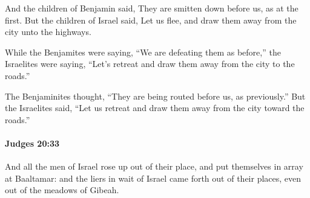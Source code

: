 			\begin{versebox}
					\item[BHS] 
					\item[ASV] And the children of Benjamin said, They are smitten down before us, as at the first. But the children of Israel said, Let us flee, and draw them away from the city unto the highways.
					\item[NIV] While the Benjamites were saying, “We are defeating them as before,” the Israelites were saying, “Let’s retreat and draw them away from the city to the roads.”
					\item[NRSV] The Benjaminites thought, “They are being routed before us, as previously.” But the Israelites said, “Let us retreat and draw them away from the city toward the roads.”
			\end{versebox}

		\paragraph{Judges 20:33} %
			\label{JUDGES-20-33}

			And all the men of Israel rose up out of their place, and put themselves in array at Baaltamar: and the liers in wait of Israel came forth out of their places, even out of the meadows of Gibeah.

